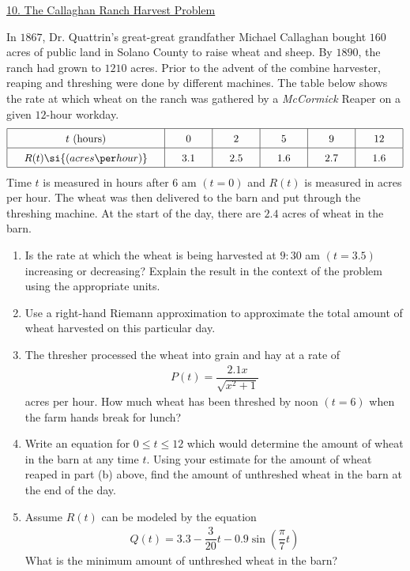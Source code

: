 \begin{center}
    \underline{10. The Callaghan Ranch Harvest Problem}
\end{center}

In $1867$, Dr. Quattrin's great-great grandfather Michael Callaghan bought $160$ acres of public land in Solano County to raise wheat and sheep. By $1890$, the ranch had grown to $1210$ acres. Prior to the advent of the combine harvester, reaping and threshing were done by different machines. The table below shows the rate at which wheat on the ranch was gathered by a \textit{McCormick} Reaper on a given $12$-hour workday. \begin{align*}
    \arraycolsep=16.5pt\def\arraystretch{1.5}
    \begin{array}{|c|c|c|c|c|c|}
        \hline
        t \text{ (hours)} & 0 & 2 & 5 & 9 & 12 \\ \hline
        R(t) \si{(acres  \per hour)} & 3.1 & 2.5 & 1.6 & 2.7 & 1.6 \\
        \hline 
    \end{array}
\end{align*}
Time $t$ is measured in hours after 6 am $(t = 0)$ and $R(t)$ is measured in acres per hour. The wheat was then delivered to the barn and put through the threshing machine. At the start of the day, there are $2.4$ acres of wheat in the barn. \\
\begin{enumerate}[label=\hspace{11pt}(\alph*), align=left, leftmargin=*, labelsep=0.25em]
    \item Is the rate at which the wheat is being harvested at $9:30$ am $(t = 3.5)$ increasing or decreasing? Explain the result in the context of the problem using the appropriate units.
    \item Use a right-hand Riemann approximation to approximate the total amount of wheat harvested on this particular day.
    \item The thresher processed the wheat into grain and hay at a rate of \begin{align*}
        P(t) = \dfrac{2.1x}{\sqrt{x^2 + 1}}
    \end{align*}
    acres per hour. How much wheat has been threshed by noon $(t = 6)$ when the farm hands break for lunch?
    \item Write an equation for $0 \leq t \leq 12$ which would determine the amount of wheat in the barn at any time $t$. Using your estimate for the amount of wheat reaped in part (b) above, find the amount of unthreshed wheat in the barn at the end of the day.
    \item Assume $R(t)$ can be modeled by the equation \begin{align*}
        Q(t) = 3.3 - \dfrac{3}{20}t - 0.9\sin \left(\dfrac{\pi}{7}t\right)
    \end{align*}
    What is the minimum amount of unthreshed wheat in the barn?
\end{enumerate} \vspace{11pt}

